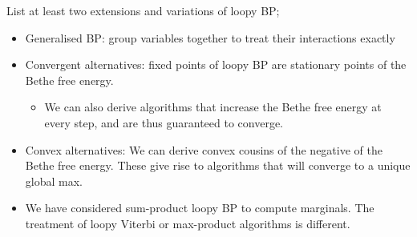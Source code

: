 \documentclass{article}
\begin{document}
List at least two extensions and variations of loopy BP; \begin{itemize} \item Generalised BP: group variables together to treat their interactions exactly \item Convergent alternatives: fixed points of loopy BP are stationary points of the Bethe free energy. \begin{itemize} \item We can also derive algorithms that increase the Bethe free energy at every step, and are thus guaranteed to converge. \end{itemize} \item Convex alternatives: We can derive convex cousins of the negative of the Bethe free energy. These give rise to algorithms that will converge to a unique global max. \item We have considered sum-product loopy BP to compute marginals. The treatment of loopy Viterbi or max-product algorithms is different. \end{itemize}
\end{document}
